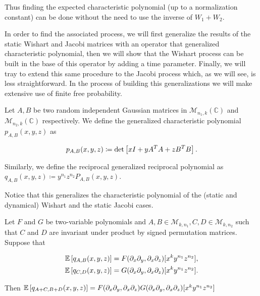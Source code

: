 Thus finding the expected characteristic polynomial (up to a normalization constant) can be done without the need to use the inverse of $W_1 + W_2$.



In order to find the associated process, we will first generalize the results of the static Wishart and Jacobi matrices with an operator that generalized characteristic polynomial, then we will show that the Wishart process can be built in the base of this operator by adding a time parameter. Finally, we will tray to extend this same procedure to the Jacobi process which, as we will see, is less straightforward. In the process of building this generalizations we will make extensive use of finite free probability.

\begin{definition}
    Let $A, B$ be two random independent Gaussian matrices in $\mathcal M_{n_1,k}(\mathbb C)$ and $\mathcal M_{n_2,k}(\mathbb C)$ respectively. We define the generalized characteristic polynomial $p_{A,B}(x,y,z)$ as

    \begin{equation*}
        p_{A,B}(x,y,z) \coloneqq \det\left[ xI + y A^TA + z B^TB \right].
    \end{equation*}

    Similarly, we define the reciprocal generalized reciprocal polynomial as $q_{A,B}(x,y,z) \coloneqq y^{n_1}z^{n_2}P_{A,B}(x,y,z)$.
\end{definition}

    Notice that this generalizes the characteristic polynomial of the (static and dynamical) Wishart and the static Jacobi cases. 

    \begin{theorem} \label{thm:multivariate_operators}
        Let $F$ and $G$ be two-variable polynomials and $A,B \in \mathcal M_{k,n_1}, C,D \in \mathcal M_{k,n_2}$ such that $C$ and $D$ are invariant under product by signed permutation matrices. Suppose that

         \begin{align*}
            \mathbb E \left[ q_{A,B}(x,y,z) \right] &= F(\partial_x \partial_y,\partial_x\partial_z)[x^ky^{n_1}z^{n_2}],\\ 
            \mathbb E \left[ q_{C,D}(x,y,z) \right] &= G(\partial_x \partial_y,\partial_x\partial_z)[x^ky^{n_1}z^{n_2}].
         \end{align*}

         Then $\mathbb E \left[ q_{A+C, B+D}(x,y,z) \right] = F(\partial_x \partial_y,\partial_x\partial_z)G(\partial_x \partial_y,\partial_x\partial_z)[x^ky^{n_1}z^{n_2}]$
    \end{theorem}

